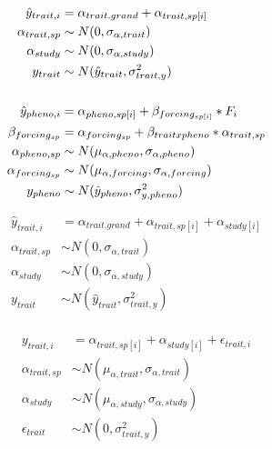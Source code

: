 \documentclass[11pt,letter]{article}
\begin{document}

\renewcommand{\refname}{\CHead{}}


\begin{align*}
\hat{y}_{trait, i} &= \alpha_{trait.grand} + \alpha_{trait, sp[i]}\\
\alpha_{trait, sp} & \sim N(0, \sigma_{\alpha, trait}) \\
\alpha_{study}  & \sim N(0, \sigma_{\alpha, study})\\
y_{trait}& \sim N(\hat{y}_{trait},\sigma^2_{trait, y}) \\
\vspace{1ex}\\
\hat{y}_{pheno, i} &= \alpha_{pheno, sp[i]} + \beta_{forcing_{sp[i]}}*F_i \\
\beta_{forcing_{sp}} & = \alpha_{forcing_{sp}} + \beta_{trait x pheno}*\alpha_{trait, sp} \\
\alpha_{pheno, sp} & \sim N(\mu_{\alpha, pheno}, \sigma_{\alpha, pheno}) \\
\alpha_{forcing_{sp}} & \sim N(\mu_{\alpha, forcing}, \sigma_{\alpha, forcing})\\
y_{pheno} & \sim N(\hat{y}_{pheno},\sigma^2_{y, pheno}) 
\end{align*}

\vspace{5ex}
\begin{align*}
\hat{y}_{trait, i} &= \alpha_{trait.grand} + \alpha_{trait, sp[i]} + \alpha_{study[i]}\\
\alpha_{trait, sp} & \sim N(0, \sigma_{\alpha, trait}) \\
\alpha_{study}  & \sim N(0, \sigma_{\alpha, study})\\
y_{trait}& \sim N(\hat{y}_{trait},\sigma^2_{trait, y}) \\
\end{align*}

\begin{align*}
y_{trait, i} &= \alpha_{trait, sp[i]} + \alpha_{study[i]} + \epsilon_{trait, i}\\
\alpha_{trait, sp} & \sim N(\mu_{\alpha, trait}, \sigma_{\alpha, trait}) \\
\alpha_{study}  & \sim N(\mu_{\alpha, study}, \sigma_{\alpha, study})\\
\epsilon_{trait} & \sim N(0,\sigma^2_{trait, y}) \\
\end{align*}
\end{document}
